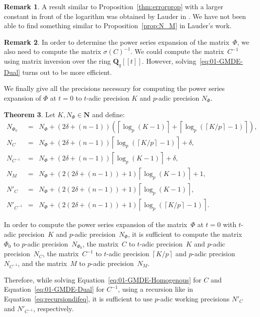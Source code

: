 \documentclass[a4paper,11pt]{article}
\numberwithin{equation}{section}
\providecommand{\ceil}[1]{\left\lceil#1\right\rceil}   %
\newcommand{\NN}{\mathbf{N}} %
\theoremstyle{definition}
\newtheorem{thm}{Theorem}[section]
\newtheorem{rem}[thm]{Remark}
\begin{document}
\begin{rem}
A result similar to Proposition~\ref{thm:errorprop} with a larger constant in front of 
the logarithm was obtained by Lauder in \citep[Theorem 5.1]{Lauder2006}. We have
not been able to find something similar to Proposition~\ref{prop:N_M} in Lauder's work.
\end{rem}

\begin{rem} \label{rem:sigmatrick}
In order to determine the power series expansion of the matrix~$\Phi$, 
we also need to compute the matrix $\sigma(C)^{-1}$. We could compute 
the matrix~$C^{-1}$ using matrix inversion over the ring $\mathbf{Q}_q[[t]]$. 
However, solving~\eqref{eq:01-GMDE-Dual} turns
out to be more efficient. 
\end{rem}

We finally give all the precisions necessary for computing the power series 
expansion of $\Phi$ at $t=0$ to $t$-adic precision $K$ and $p$-adic 
precision $N_{\Phi}$.

\begin{thm} \label{thm:Ni}
Let $K,N_{\Phi} \in \NN$ and define:
\begin{eqnarray*}
N_{\Phi_0}   		&=& N_{\Phi}+\left(2\delta+(n-1)\right) \left( \ceil{\log_p(K-1)} + \ceil{\log_p(\ceil{K/p}-1)}\right),\\
N_{C}				&=& N_{\Phi}+\left(2\delta+(n-1)\right) \ceil{ \log_p(\ceil{K/p}-1)} + \delta, \\
N_{C^{-1}}			&=& N_{\Phi}+\left(2\delta+(n-1)\right) \ceil{\log_p(K-1)} + \delta, \\
N_M                 &=& N_{\Phi}+\left(2\left(2 \delta + (n-1)\right) + 1\right) \ceil{\log_p(K-1)}+1, \\
N'_C			    &=& N_{\Phi}+\left(2 \left(2 \delta + (n-1)\right) + 1\right) \ceil{\log_p(K-1)}, \\
N'_{C^{-1}}	        &=& N_{\Phi}+\left(2 \left(2 \delta + (n-1)\right) + 1\right) \ceil{\log_p(\ceil{K/p}-1)}.
\end{eqnarray*}

In order to compute the power series expansion of the matrix~$\Phi$ at $t=0$ 
with $t$-adic precision~$K$ and $p$-adic precision~$N_{\Phi}$, it is 
sufficient to compute the matrix~$\Phi_0$ to $p$-adic precision~$N_{\Phi_0}$,
the matrix~$C$ to $t$-adic precision~$K$ and $p$-adic precision~$N_{C}$, 
the matrix~$C^{-1}$ to $t$-adic precision $\ceil{K/p}$ and $p$-adic 
precision~$N_{C^{-1}}$, and the matrix~$M$ to $p$-adic precision~$N_M$.

Therefore, while solving Equation~\eqref{eq:01-GMDE-Homogenous} for $C$ and 
Equation~\eqref{eq:01-GMDE-Dual} for $C^{-1}$, using a recursion like in 
Equation~\eqref{eq:recursiondifeq}, it is sufficient to use $p$-adic 
working precisions $N'_C$ and $N'_{C^{-1}}$, respectively.
\end{thm}
\end{document}
